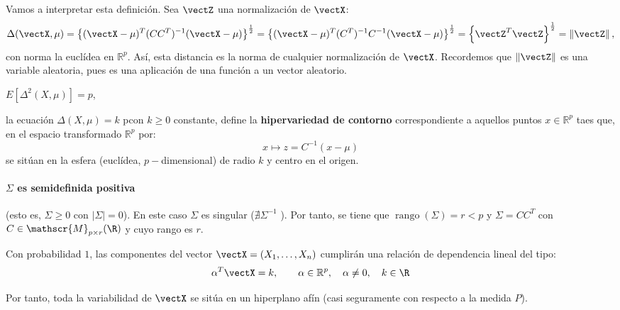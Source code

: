   Vamos a interpretar esta definición. Sea $\vectZ$ una normalización de $\vectX$:
  \[
  \Delta(\vectX,\mu) = \left\{ (\vectX-\mu)^T (CC^T)^{-1}(\vectX-\mu)\right\}^{\frac{1}{2}} = \left\{ (\vectX-\mu)^T (C^T)^{-1}C^{-1}(\vectX-\mu)\right\}^{\frac{1}{2}} = \left\{\vectZ^T \vectZ\right\}^{\frac{1}{2}} = \Vert \vectZ\Vert\,,
  \]
  con norma la euclídea en $\mathbb R^p$. Así, esta distancia es la norma de cualquier normalización de $\vectX$. Recordemos que $\Vert \vectZ\Vert$ es una variable aleatoria, pues es una aplicación de una función a un vector aleatorio.

  \begin{nprop}\hfill
    \begin{nlist}
    \item $E[\Delta^2 (X,\mu)] = p$,
    \item la ecuación $\Delta(X,\mu) = k$ pcon $k\geq 0$ constante, define la \textbf{hipervariedad de contorno} correspondiente a aquellos puntos $x \in \mathbb R^p$ taes que, en el espacio transformado $\mathbb R^p$ por:
      \[
      x \mapsto z = C^{-1}(x-\mu)
      \]
      se sitúan en la esfera (euclídea, $p-$dimensional) de radio $k$ y centro en el origen.
    \end{nlist}

  \end{nprop}

\paragraph{$\Sigma$ es \textbf{semidefinida positiva}} (esto es, $\Sigma \geq 0$ con $|\Sigma| = 0$).  En este caso $\Sigma$ es singular ($\nexists \Sigma ^{-1} $ ). Por tanto, se tiene que $\operatorname{rango}(\Sigma) = r < p$ y $\Sigma = C C^T$ con $C \in \mathscr{M}_{p\times r}(\R)$ y cuyo rango es $r$.\\

  \begin{ncor}
    Con probabilidad $1$, las componentes del vector $\vectX = (X_1, \dots, X_n)$ cumplirán una relación de dependencia lineal del tipo:
    \[
    \alpha^T \vectX = k, \quad \quad \alpha \in \mathbb R^p, \quad \alpha \ne 0 , \quad k \in \R
    \]
    
  Por tanto, toda la variabilidad de $\vectX$ se sitúa en un hiperplano afín (casi seguramente con respecto a la medida $P$).
\end{ncor}

